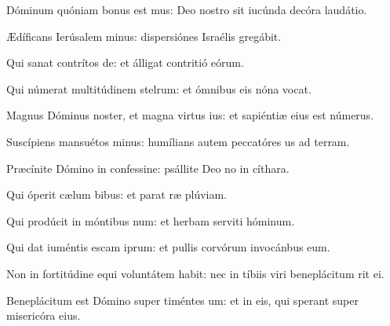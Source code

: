 \item {} Dóminum quóniam bonus est mus:\psstar{} Deo nostro sit iucúnda decóra laudátio.

\item Ædíficans Ierúsalem minus:\psstar{} dispersiónes Israélis gregábit.

\item Qui sanat contrítos de:\psstar{} et álligat contritió eórum.

\item Qui númerat multitúdinem stelrum:\psstar{} et ómnibus eis nóna vocat.

\item Magnus Dóminus noster, et magna virtus ius:\psstar{} et sapiéntiæ eius  est númerus.

\item Suscípiens mansuétos minus:\psstar{} humílians autem peccatóres us ad terram.

\item Præcínite Dómino in confessine:\psstar{} psállite Deo no in cíthara.

\item Qui óperit cælum bibus:\psstar{} et parat ræ plúviam.

\item Qui prodúcit in móntibus num:\psstar{} et herbam serviti hóminum.

\item Qui dat iuméntis escam iprum:\psstar{} et pullis corvórum invocánbus eum.

\item Non in fortitúdine equi voluntátem habit:\psstar{} nec in tíbiis viri beneplácitum rit ei.

\item Beneplácitum est Dómino super timéntes um:\psstar{} et in eis, qui sperant super misericóra eius.

